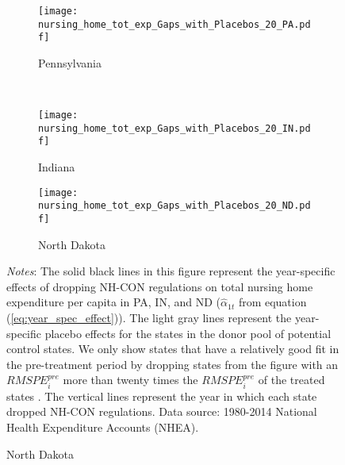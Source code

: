 \documentclass[../Main.tex]{subfiles}
\begin{document}
\newpage
\begin{figure}[t]
	\begin{center}
	\caption{\label{fig:tot_exp_gaps} \centering Year-Specific Effects of Dropping NH-CON on Total Expenditure Per Capita ($\hat{\alpha}_{1t}$)}
    \begin{subfigure}[b]{\textwidth} \centering
    \caption{Pennsylvania}\texttt{[image: nursing\_home\_tot\_exp\_Gaps\_with\_Placebos\_20\_PA.pdf]}
    \end{subfigure}\\
    \vspace{.4cm}
    \begin{subfigure}[b]{.48\textwidth} \centering
    \caption{Indiana}\texttt{[image: nursing\_home\_tot\_exp\_Gaps\_with\_Placebos\_20\_IN.pdf]}
    \end{subfigure}\quad%
    \begin{subfigure}[b]{.48\textwidth} \centering
    \caption{North Dakota}\texttt{[image: nursing\_home\_tot\_exp\_Gaps\_with\_Placebos\_20\_ND.pdf]}
    \end{subfigure}
    \end{center}
    \footnotesize
		\textit{Notes}: The solid black lines in this figure represent the year-specific effects of dropping NH-CON regulations on total nursing home expenditure per capita in PA, IN, and ND ($\hat{\alpha}_{1t}$ from equation (\ref{eq:year_spec_effect})). The light gray lines represent the year-specific placebo effects for the states in the donor pool of potential control states. We only show states that have a relatively good fit in the pre-treatment period by dropping states from the figure with an $RMSPE_i^{pre}$ more than twenty times the $RMSPE_i^{pre}$ of the treated states \citep{abadie2010synthetic}. The vertical lines represent the year in which each state dropped NH-CON regulations. Data source: 1980-2014 National Health Expenditure Accounts (NHEA).
\end{figure}
\clearpage
\end{document}
